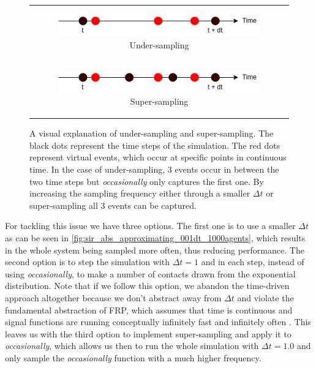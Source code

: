 \begin{figure}
\begin{center}
	\begin{tabular}{c}
		\begin{subfigure}[b]{0.5\textwidth}
			\centering
			\includegraphics[width=1\textwidth, angle=0]{./fig/timedriven/undersampling.png}
			\caption{Under-sampling}
			\label{fig:undersampling}
		\end{subfigure}
		
		\\
		
		\begin{subfigure}[b]{0.5\textwidth}
			\centering
			\includegraphics[width=1\textwidth, angle=0]{./fig/timedriven/supersampling.png}
			\caption{Super-sampling}
			\label{fig:supersampling}
		\end{subfigure}
	\end{tabular}
	
	\caption{A visual explanation of under-sampling and super-sampling. The black dots represent the time steps of the simulation. The red dots represent virtual events, which occur at specific points in continuous time. In the case of under-sampling, 3 events occur in between the two time steps but \textit{occasionally} only captures the first one. By increasing the sampling frequency either through a smaller $\Delta t$ or super-sampling all 3 events can be captured.} 
	\label{fig:sampling_issue}
\end{center}
\end{figure}

For tackling this issue we have three options. The first one is to use a smaller $\Delta t$ as can be seen in \ref{fig:sir_abs_approximating_001dt_1000agents}, which results in the whole system being sampled more often, thus reducing performance. The second option is to step the simulation with $\Delta t = 1$ and in each step, instead of using \textit{occasionally}, to make a number of contacts drawn from the exponential distribution. Note that if we follow this option, we abandon the time-driven approach altogether because we don't abstract away from $\Delta t$ and violate the fundamental abstraction of FRP, which assumes that time is continuous and signal functions are running conceptually infinitely fast and infinitely often \cite{winograd-cort_wormholes:_2012}. This leaves us with the third option to implement super-sampling and apply it to \textit{occasionally}, which allows us then to run the whole simulation with $\Delta t = 1.0$ and only sample the \textit{occasionally} function with a much higher frequency.

